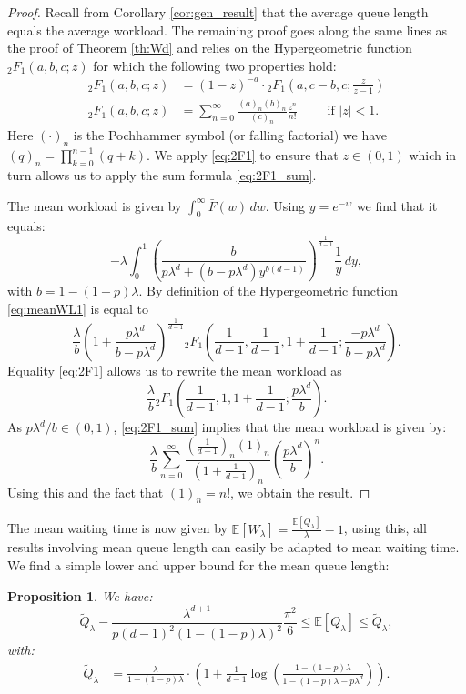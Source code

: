 \documentclass[12pt]{report}
\newcommand{\E}{\mathbb{E}}
\newtheorem{proposition}[theorem]{Proposition}
\begin{document}
\begin{proof}

Recall from Corollary \ref{cor:gen_result} that the average queue length equals the average workload. The remaining proof goes along the same lines as the proof of Theorem \ref{th:Wd} and relies
on the Hypergeometric function ${}_2F_1(a,b,c;z)$ for which the following two properties hold:
\begin{align}
{}_{2}F_1(a,b,c;z)
&=
(1-z)^{-a} \cdot {}_{2}F_1\left(a,c-b,c;\frac{z}{z-1}\right) \label{eq:2F1}\\
{}_2F_1(a,b,c;z)
&= \sum_{n=0}^\infty \frac{(a)_n (b)_n}{(c)_n} \frac{z^n}{n!}  \qquad \mbox{ if } |z|<1.\label{eq:2F1_sum}
\end{align}
Here $(\cdot )_n$ is the Pochhammer symbol (or falling factorial) we have $(q)_n = \prod_{k=0}^{n-1} (q+k)$. We apply \eqref{eq:2F1} to ensure that $z\in (0,1)$ which in turn allows us to apply the sum formula \eqref{eq:2F1_sum}.

The mean workload is given by $\int_{0}^\infty  \bar F(w)\, dw$. Using $y=e^{-w}$ we find that it equals:
\begin{equation}
-\lambda \int_0^1 \left(\frac{b}{p\lambda^d + (b-p\lambda^d)y^{b(d-1)}}\right)^{\frac{1}{d-1}} \frac{1}{y}\, dy, \label{eq:meanWL1}
\end{equation}
with $b=1-(1-p)\lambda$.
By definition of the Hypergeometric function \eqref{eq:meanWL1} is equal to 
$$\frac{\lambda}{b} \left( 1 + \frac{p \lambda^d}{b-p\lambda^d} \right)^{\frac{1}{d-1}} {}_{2}F_1\left( \frac{1}{d-1}, \frac{1}{d-1}, 1 + \frac{1}{d-1}; \frac{-p \lambda^d}{b-p\lambda^d}\right).$$
Equality \eqref{eq:2F1} allows us to rewrite the mean workload as 
$$\frac{\lambda}{b}{}_{2}F_1\left( \frac{1}{d-1}, 1, 1+\frac{1}{d-1}; \frac{p \lambda^d}{b} \right).$$
As $p \lambda^d/b \in (0,1)$, \eqref{eq:2F1_sum} implies that the mean workload is given by:
$$
\frac{\lambda}{b} \sum_{n=0}^\infty \frac{\left(\frac{1}{d-1}\right)_n (1)_n}{\left(1+\frac{1}{d-1}\right)_n} \left( \frac{p \lambda^d}{b} \right)^n.
$$
Using this and the fact that $(1)_n=n!$, we obtain the result.
\end{proof}
The mean waiting time is now given by $\E[W_\lambda] = \frac{\E[Q_\lambda]}{\lambda} - 1$, using this, all results involving mean queue length can easily be adapted to mean waiting time. We find a simple lower and upper bound for the mean queue length:
\begin{proposition}\label{prop:approxWL_LLd}
We have:
$$
\tilde Q_\lambda - \frac{\lambda^{d+1}}{p (d-1)^2(1-(1-p)\lambda)^2} \frac{\pi^2}{6} \leq \E[Q_\lambda] \leq \tilde Q_\lambda,
$$
with:
\begin{align}
\tilde{Q}_\lambda
&=
\frac{\lambda}{1-(1-p)\lambda} \cdot \left( 1 + \frac{1}{d-1} \log\left(\frac{1-(1-p)\lambda}{1-(1-p)\lambda-p\lambda^d}\right) \right). \label{eq:WLLdtilde}
\end{align}
\end{proposition}
\end{document}
